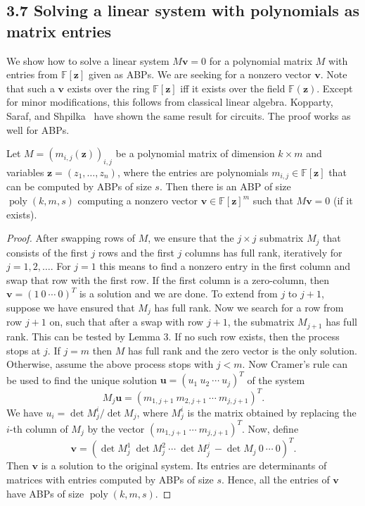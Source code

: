 \subsection*{3.7 Solving a linear system with polynomials as matrix entries}
We show how to solve a linear system $M\mathbf v=0$ for a polynomial matrix $M$ with entries from $\mathbb F[\mathbf z]$ given as ABPs. We are seeking for a nonzero vector $\mathbf v$. Note that such a $\mathbf v$ exists over the ring $\mathbb F[\mathbf z]$ iff it exists over the field $\mathbb F(\mathbf z)$.
Except for minor modifications, this follows from classical linear algebra. Kopparty, Saraf, and Shpilka~\cite[Lemma 2.6]{ref12} have shown the same result for circuits. The proof works as well for ABPs.
\begin{ntlemma}
Let $M=(m_{i,j}(\mathbf z))_{i,j}$ be a polynomial matrix of dimension $k\times m$ and variables $\mathbf z=(z_1,\ldots,z_n)$, where the entries are polynomials $m_{i,j}\in\mathbb F[\mathbf z]$ that can be computed by ABPs of size $s$.
Then there is an ABP of size $\operatorname{poly}(k,m,s)$ computing a nonzero vector $\mathbf v\in\mathbb F[\mathbf z]^m$ such that $M\mathbf v=0$ (if it exists).
\end{ntlemma}
\begin{proof}
After swapping rows of $M$, we ensure that the $j\times j$ submatrix $M_j$ that consists of the first $j$ rows and the first $j$ columns has full rank, iteratively for $j=1,2,\ldots$.
For $j=1$ this means to find a nonzero entry in the first column and swap that row with the first row. If the first column is a zero-column, then $\mathbf v=(1\ 0\ \cdots\ 0)^T$ is a solution and we are done. To extend from $j$ to $j+1$, suppose we have ensured that $M_j$ has full rank. Now we search for a row from row $j+1$ on, such that after a swap with row $j+1$, the submatrix $M_{j+1}$ has full rank. This can be tested by Lemma 3. If no such row exists, then the process stops at $j$. If $j=m$ then $M$ has full rank and the zero vector is the only solution. Otherwise, assume the above process stops with $j<m$.
Now Cramer's rule can be used to find the unique solution $\mathbf u=(u_1\ u_2\ \cdots\ u_j)^T$ of the system
\[M_j\mathbf u=(m_{1,j+1}\ m_{2,j+1}\ \cdots\ m_{j,j+1})^T.\]
We have $u_i=\det M_j^i/\det M_j$, where $M_j^i$ is the matrix obtained by replacing the $i$-th column of $M_j$ by the vector $(m_{1,j+1}\ \cdots\ m_{j,j+1})^T$. Now, define
\[\mathbf v=(\det M_j^1\ \det M_j^2\ \cdots\ \det M_j^j\ -\det M_j\ 0\ \cdots\ 0)^T.\]
Then $\mathbf v$ is a solution to the original system. Its entries are determinants of matrices with entries computed by ABPs of size $s$. Hence, all the entries of $\mathbf v$ have ABPs of size $\operatorname{poly}(k,m,s)$.
\end{proof}
